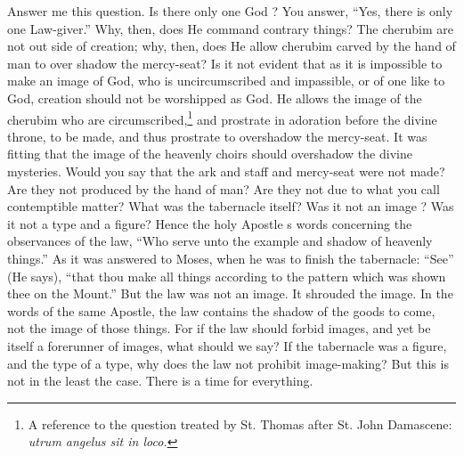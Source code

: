 \documentclass[10pt]{book}
\newcommand{\switchGreek}[1][]{\selectlanguage{polutonikogreek} \switchcolumn*[#1]}
\begin{document}
\begin{paracol}{2}
Answer me this question. Is there only one 
God ? You answer, ``Yes, there is only one 
Law-giver.'' Why, then, does He command 
contrary things? The cherubim are not out 
side of creation; why, then, does He allow 
cherubim carved by the hand of man to over 
shadow the mercy-seat? Is it not evident that 
as it is impossible to make an image of God, 
who is uncircumscribed and impassible, or of 
one like to God, creation should not be 
worshipped as God. He allows the image of 
the cherubim who are circumscribed,\footnote{A reference to the question treated by St. Thomas after St. John Damascene: \emph{utrum angelus sit in loco.}} and 
prostrate in adoration before the divine throne, 
to be made, and thus prostrate to overshadow 
the mercy-seat. It was fitting that the image 
of the heavenly choirs should overshadow the 
divine mysteries. Would you say that the ark 
and staff and mercy-seat were not made? Are 
they not produced by the hand of man? Are 
they not due to what you call contemptible 
matter? What was the tabernacle itself? 
Was it not an image ? Was it not a type 
and a figure? Hence the holy Apostle s words 
concerning the observances of the law, ``Who 
serve unto the example and shadow of heavenly 
things.'' As it was answered to Moses, when 
he was to finish the tabernacle: ``See'' (He 
says), ``that thou make all things according to 
the pattern which was shown thee on the 
Mount.'' But the law was not an image. It 
shrouded the image. In the words of the same 
Apostle, the law contains the shadow of the 
goods to come, not the image of those things. 
For if the law should forbid images, and yet be 
itself a forerunner of images, what should we 
say? If the tabernacle was a figure, and the 
type of a type, why does the law not prohibit 
image-making? But this is not in the least 
the case. There is a time for everything. 

\switchGreek


\end{paracol}
\end{document}
